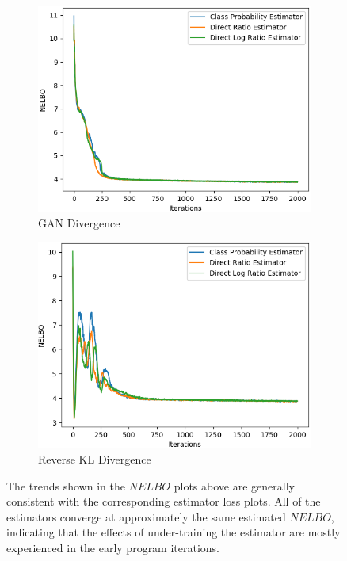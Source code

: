 \documentclass[honours,12pt]{unswthesis}
\numberwithin{equation}{section}
\theoremstyle{definition}
\begin{document}
\begin{figure}[h]
\begin{subfigure}{0.49\textwidth}
\includegraphics[width=\linewidth]{part2nelbos/PCADVvsPCADVexpvsPCADVgudlog.png}
\caption{GAN Divergence}
\end{subfigure}
\begin{subfigure}{0.49\textwidth}
\includegraphics[width=\linewidth]{part2nelbos/PCKLDvsPCKLexpvsPCKLgudlog.png}
\caption{Reverse KL Divergence}
\end{subfigure}
\caption{\small The trends shown in the $NELBO$ plots above are generally consistent with the corresponding estimator loss plots. All of the estimators converge at approximately the same estimated $NELBO$, indicating that the effects of under-training the estimator are mostly experienced in the early program iterations.}
\end{figure}
\end{document}
